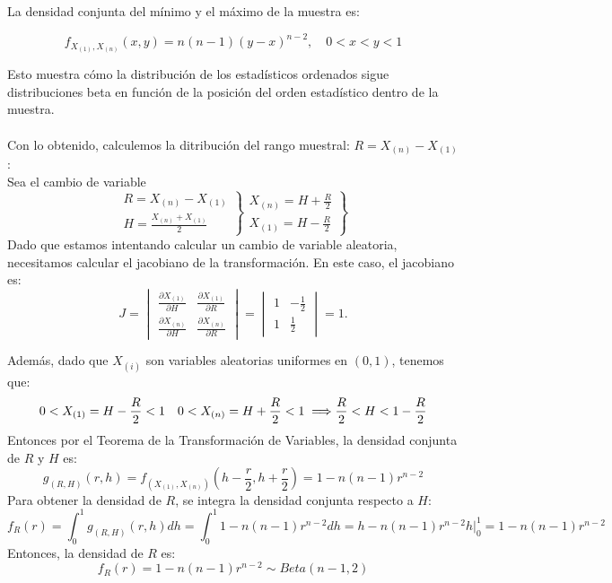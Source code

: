 {La densidad conjunta del mínimo y el máximo de la muestra es:

$$ f_{X_{(1)}, X_{(n)}}(x,y) = n(n-1)(y-x)^{n-2}, \quad 0 < x < y < 1 $$

Esto muestra cómo la distribución de los estadísticos ordenados sigue
distribuciones beta en función de la posición del orden estadístico dentro de
la muestra. \\\\ Con lo obtenido, calculemos la ditribución del rango muestral:
$R = X_{(n)} - X_{(1)}$: \\ Sea el cambio de variable $$    \left.\left.\begin{array}{l}
		R=X_{(n)}-X_{(1)} \\
		H=\frac{X_{(n)}+X_{(1)}}{2}
	\end{array}\right\} \begin{array}{c}
		X_{(n)}=H+\frac{R}{2} \\
		X_{(1)}=H-\frac{R}{2}
	\end{array}\right\}$$
Dado que estamos intentando calcular un cambio de variable aleatoria, necesitamos calcular el jacobiano de la transformación. En este caso, el jacobiano es:
\[
	J=
	\begin{vmatrix}
		\frac{\partial{X_{(1)}}}{\partial{H}} & \frac{\partial{X_{(1)}}}{\partial{R}} \\
		\frac{\partial{X_{(n)}}}{\partial{H}} & \frac{\partial{X_{(n)}}}{\partial{R}}
	\end{vmatrix}
	=
	\begin{vmatrix}
		1 & -\frac{1}{2} \\
		1 & \frac{1}{2}
	\end{vmatrix}
	= 1.
\]

Además, dado que $X_{(i)}$ son variables aleatorias uniformes en $(0,1)$,
tenemos que: \\ $$ 0 < X_{(1)} = H - \frac{R}{2} < 1 \quad 0 < X_{(n)} = H +
	\frac{R}{2} < 1 \implies \\ \frac{R}{2} < H < 1 - \frac{R}{2}$$ Entonces por el
Teorema de la Transformación de Variables, la densidad conjunta de $R$ y $H$
es: $$
	g_{(R,H)}(r,h)=f_{(X_{(1)},X_{(n)})}\left(h-\frac{r}{2},h+\frac{r}{2}\right)=1-n(n-1)r^{n-2}
$$ Para obtener la densidad de $R$, se integra la densidad conjunta respecto a
$H$: $$
	f_{R}(r)=\int_{0}^{1}g_{(R,H)}(r,h)dh=\int_{0}^{1}1-n(n-1)r^{n-2}dh=h-n(n-1)r^{n-2}h\Big|_{0}^{1}=1-n(n-1)r^{n-2}
$$ Entonces, la densidad de $R$ es: $$ f_{R}(r)=1-n(n-1)r^{n-2} \sim
	Beta(n-1,2) $$ }

